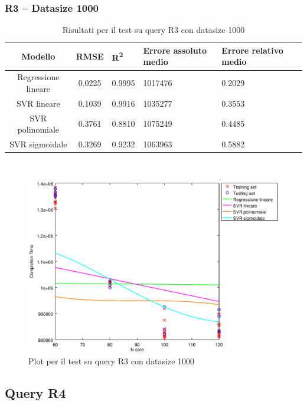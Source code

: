 \documentclass[a4paper,11pt]{article}
\begin{document}
\subsubsection{R3 -- Datasize 1000}
\begin{table}[bhpt]
	\centering
	\begin{adjustbox}{center}
		\begin{tabular}{c | c M{1.2cm} M{2.5cm} M{2.5cm} M{1.8cm}}
			Modello & RMSE & R\textsuperscript{2} & Errore assoluto medio & Errore relativo medio \tabularnewline
			\hline
			Regressione lineare & 0.0225 & 0.9995 & 1017476 & 0.2029 \\
			SVR lineare & 0.1039 & 0.9916 & 1035277 & 0.3553 \\
			SVR polinomiale & 0.3761 & 0.8810 & 1075249 & 0.4485 \\
			SVR sigmoidale & 0.3269 & 0.9232 & 1063963 & 0.5882 \\
		\end{tabular}
	\end{adjustbox}
	\\
	\caption{Risultati per il test su query R3 con datasize 1000}
	\label{table_R3_1000}
\end{table}

\begin {figure}[hbtp]
\centering
\includegraphics[width=\textwidth]{output/R3_1000/plot_R3_1000.eps}
\caption {Plot per il test su query R3 con datasize 1000}
\end {figure}

\newpage
\subsection{Query R4}
\end{document}
